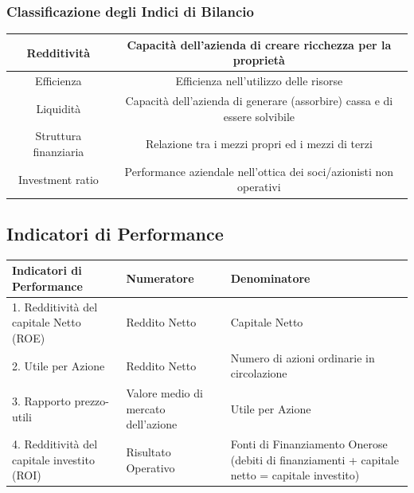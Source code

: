 \documentclass{article}
\renewcommand{\arraystretch}{1.5}
\begin{document}
\subsubsection{Classificazione degli Indici di Bilancio}
\begin{center}
    \renewcommand{\arraystretch}{2.5}
    \begin{tabular}{|c|c|}
        \hline
        Redditività & Capacità dell'azienda di creare ricchezza per
        la proprietà\\
        \hline 
        Efficienza & Efficienza nell'utilizzo delle risorse\\
        \hline 
        Liquidità & Capacità dell'azienda di generare (assorbire)
        cassa e di essere solvibile\\
        \hline 
        Struttura finanziaria & Relazione tra i mezzi propri ed i mezzi di terzi \\
        \hline 
        Investment ratio & Performance aziendale nell'ottica dei
        soci/azionisti non operativi\\    
        \hline 
    \end{tabular}
\end{center}


\subsection{Indicatori di Performance}
\begin{center}
    \renewcommand{\arraystretch}{2}
    \begin{tabular}{|p{5cm}|p{5cm}|p{5cm}|}
        \hline 
        \textbf{Indicatori di Performance} & \textbf{Numeratore} & \textbf{Denominatore}\\
        \hline 
        1. Redditività del capitale Netto (ROE) & Reddito Netto & Capitale Netto\\
        \hline 
        2. Utile per Azione & Reddito Netto & Numero di azioni ordinarie in
        circolazione\\
        \hline 
        3. Rapporto prezzo-utili & Valore medio di mercato
        dell'azione & Utile per Azione\\
        \hline
        4. Redditività del capitale investito (ROI) & Risultato Operativo & Fonti di Finanziamento Onerose
        (debiti di finanziamenti + capitale
        netto = capitale investito)\\
        \hline 
    \end{tabular}
\end{center}
\end{document}
